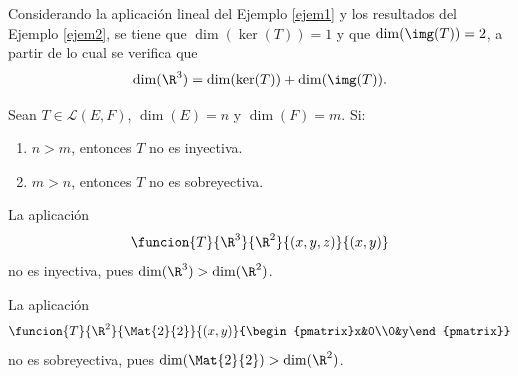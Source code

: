 \documentclass[compacto,10pt]{pubciencias-notas}
\begin{document}
\begin{ejem}\hspace{0pt}
Considerando la aplicación lineal del Ejemplo \ref{ejem1} y los resultados del Ejemplo \ref{ejem2}, se tiene que $\dim(\ker(T)) = 1$ y que $\dim(\img(T)) = 2$, a partir de lo cual se verifica que 
\[
    \dim(\R^{3}) = \dim(\ker(T)) +  \dim(\img(T)).
\]
\end{ejem}

\begin{teo}
Sean $T\in\mathscr{L}(E,F)$, $\dim(E)=n$ y $\dim(F)=m$. Si:
\begin{enumerate}
    \item $n>m$, entonces $T$ no es inyectiva.
    \item $m>n$, entonces $T$ no es sobreyectiva.
\end{enumerate}
\end{teo}

\begin{ejem}\hspace{0pt}
La aplicación
\[
    \funcion{T}{\R^3}{\R^2}{(x,y,z)}{(x,y)}
\]
no es inyectiva, pues $\dim(\R^{3}) > \dim(\R^{2})$. 
\end{ejem}

\begin{ejem}\hspace{0pt}
La aplicación
\[
    \funcion{T}{\R^2}{\Mat{2}{2}}{(x,y)}{\begin{pmatrix}x&0\\0&y\end{pmatrix}}
\]
no es sobreyectiva, pues $\dim(\Mat{2}{2}) > \dim(\R^{2})$.
\end{ejem}
\end{document}
